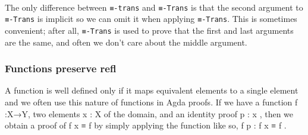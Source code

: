 \begin{code}
\AgdaSymbol{:}\AgdaSpace{}%
\AgdaSymbol{(}\AgdaSpace{}%
\AgdaSymbol{:}\AgdaSpace{}%
\AgdaSymbol{)\{}\AgdaSpace{}%
\AgdaSymbol{:}\AgdaSpace{}%
\AgdaSymbol{\}(}\AgdaSpace{}%
\AgdaSymbol{:}\AgdaSpace{}%
\AgdaSymbol{)}\AgdaSpace{}%
\AgdaSpace{}%
\AgdaSpace{}%
\AgdaSpace{}%
\AgdaSpace{}%
\AgdaSpace{}%
\AgdaSpace{}%
\AgdaSpace{}%
\AgdaSpace{}%
\AgdaSpace{}%
\AgdaSpace{}%
\AgdaSpace{}%
\<%
\\
%
\>[1]\AgdaSpace{}%
\AgdaSpace{}%
\AgdaSymbol{\{}\AgdaSymbol{\}}\AgdaSpace{}%
\AgdaSpace{}%
\AgdaSymbol{(}\AgdaSpace{}%
\AgdaSymbol{\AgdaUnderscore{})}\AgdaSpace{}%
\AgdaSymbol{(}\AgdaSpace{}%
\AgdaSymbol{\AgdaUnderscore{})}\AgdaSpace{}%
\AgdaSymbol{=}\AgdaSpace{}%
\AgdaSpace{}%
\AgdaSymbol{\AgdaUnderscore{}}\<%
\end{code}
\ccpad
The only difference between \texttt{≡-trans} and \texttt{≡-Trans} is that the second argument to \texttt{≡-Trans} is implicit so we can omit it when applying \texttt{≡-Trans}. This is sometimes convenient; after all, \texttt{≡-Trans} is used to prove that the first and last arguments are the same, and often we don't care about the middle argument.

\subsubsection{Functions preserve refl}\label{functions-preserve-refl}
A function is well defined only if it maps equivalent elements to a single element and we often use this nature of functions in Agda proofs. If we have a function \ab f \as :\ab X\as →\ab Y, two elements \ab x  \as : \ab X of the domain, and an identity proof \ab p \as : \ab x  , then we obtain a proof of \ab f \ab x \ad ≡ \ab f  by simply applying the  function like so,  \ab f \ab p \as : \ab f \ab x \ad ≡ \ab f .

